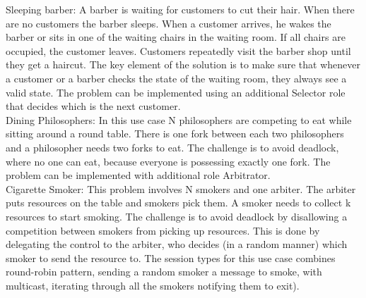 \begin{enumerate}
{Sleeping barber: A barber is waiting for customers to cut their hair. When there are no customers the barber sleeps. When a customer arrives, he wakes the barber or sits in one of the waiting chairs in the waiting room. If all chairs are occupied, the customer leaves. Customers repeatedly visit the barber shop until they get a
haircut. The key element of the solution is to make sure that whenever a customer or a barber checks the state of the waiting room, they always see a valid state. The problem can be implemented using an additional Selector role that decides which is the next customer. \\

Dining Philosophers: In this use case N philosophers are competing to eat while sitting
around a round table. There is one fork between each two philosophers and a philosopher needs
two forks to eat. The challenge is to avoid deadlock, where no one can eat, because everyone
is possessing exactly one fork. The problem can be implemented with additional role Arbitrator. \\

Cigarette Smoker: This problem involves N smokers and one arbiter. The arbiter puts resources
on the table and smokers pick them. A smoker needs to collect k resources to start smoking. The
challenge is to avoid deadlock by disallowing a competition between smokers from picking up
resources. This is done by delegating the control to the arbiter, who decides (in a random manner)
which smoker to send the resource to. The session types for this use case combines round-robin
pattern, sending a random smoker a message to smoke, with multicast, iterating
through all the smokers notifying them to exit). \\



}
\end{enumerate}
